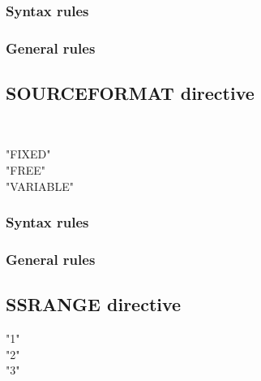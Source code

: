 \subsubsection{Syntax rules}

\subsubsection{General rules}

\subsection{SOURCEFORMAT directive}

\begin{syntax}[\miscextcolour]
  \begin{1=}
     \\
  \end{1=}
  \begin{1=}
    "FIXED" \\
    "FREE" \\
    "VARIABLE"
  \end{1=}
\end{syntax}

\subsubsection{Syntax rules}

\subsubsection{General rules}

\subsection{SSRANGE directive}

\begin{syntax}[\miscextcolour]
  \begin{0-1}
    "1" \\
    "2" \\
    "3"
  \end{0-1}
\end{syntax}

\begin{syntax}[\miscextcolour]
  \begin{1=}
     \\
  \end{1=}
\end{syntax}

